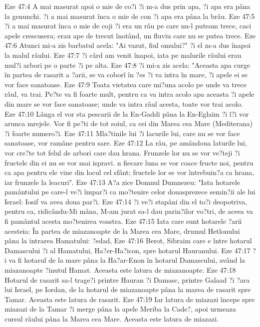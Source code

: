 Eze 47:4  A mai masurat apoi o mie de co?i ?i m-a dus prin apa, ?i apa era pâna la genunchi. ?i a mai masurat înca o mie de con ?i apa era pâna la brâu.
Eze 47:5  ?i a mai masurat înca o mie de coji ?i era un râu pe care nu-l puteam trece, caci apele crescusera; erau ape de trecut înotând, un fluviu care nu se putea trece.
Eze 47:6  Atunci mi-a zis barbatul acela: "Ai vazut, fiul omului?" ?i el m-a dus înapoi la malul râului.
Eze 47:7  ?i cârd am venit înapoi, iata pe malurile râului erau mul?i arbori pe o parte ?i pe alta.
Eze 47:8  ?i mi-a zis acela: "Aceasta apa curge în partea de rasarit a ?arii, se va coborî în ?es ?i va intra în mare, ?i apele ei se vor face sanatoase.
Eze 47:9  Toata vietatea care mi?una acolo pe unde va trece râul, va trai. Pe?te va fi foarte mult, pentru ca va intra acolo apa aceasta ?i apele din mare se vor face sanatoase; unde va intra râul acesta, toate vor trai acolo.
Eze 47:10  Lânga el vor sta pescarii de la En-Gaddi pâna la En-Eglaim ?i î?i vor arunca mrejele. Vor fi pe?ti de tot soiul, ca cei din Marea cea Mare (Mediterana) ?i foarte numero?i.
Eze 47:11  Mla?tinile lui ?i lacurile lui, care nu se vor face sanatoase, vor ramâne pentru sare.
Eze 47:12  La râu, pe amândoua laturile lui, vor cre?te tot felul de arbori care dau hrana. Frunzele lor nu se vor ve?teji ?i fructele din ei nu se vor mai ispravi. n fiecare luna se vor coace fructe noi, pentru ca apa pentru ele vine din locul cel sfânt; fructele lor se vor întrebuin?a ca hrana, iar frunzele la leacuri".
Eze 47:13  A?a zice Domnul Dumnezeu: "Iata hotarele pamântului pe care-l ve?i împar?i ca mo?tenire celor douasprezece semin?ii ale lui Israel: Iosif va avea doua par?i.
Eze 47:14  ?i ve?i stapâni din el to?i deopotriva, pentru ca, ridicându-Mi mâna, M-am jurat sa-l dau parin?ilor vo?tri, de aceea va fi pamântul acesta mo?tenirea voastra.
Eze 47:15  Iata care sunt hotarele ?arii acesteia: În partea de miazanoapte de la Marea cea Mare, drumul Hetlonului pâna la intrarea Hamatului: ?edad,
Eze 47:16  Berot, Sibraim care e între hotarul Damascului ?i al Hamatului, Ha?er-Ha?icon, spre hotarul Hauranului.
Eze 47:17  ?i va fi hotarul de la mare pâna la Ha?ar-Enon în hotarul Damascului, având la miazanoapte ?inutul Hamat. Aceasta este latura de miazanoapte.
Eze 47:18  Hotarul de rasarit sa-l trage?i printre Hauran ?i Damasc, printre Galaad ?i ?ara lui Israel, pe Iordan, de la hotarul de miazanoapte pâna la marea de rasarit spre Tamar. Aceasta este latura de rasarit.
Eze 47:19  Iar latura de miazazi începe spre miazazi de la Tamar ?i merge pâna la apele Meriba la Cade?, apoi urmeaza cursul râului pâna la Marea cea Mare. Aceasta este latura de miazazi.
